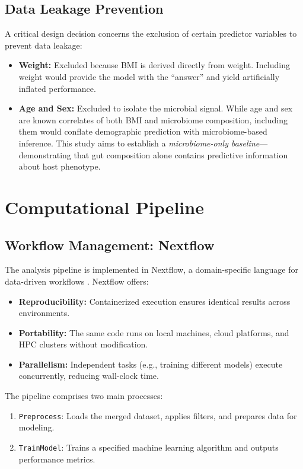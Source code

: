 \subsection{Data Leakage Prevention}

A critical design decision concerns the exclusion of certain predictor variables to prevent data leakage:

\begin{itemize}
    \item \textbf{Weight:} Excluded because BMI is derived directly from weight. Including weight would provide the model with the ``answer'' and yield artificially inflated performance.
    \item \textbf{Age and Sex:} Excluded to isolate the microbial signal. While age and sex are known correlates of both BMI and microbiome composition, including them would conflate demographic prediction with microbiome-based inference. This study aims to establish a \emph{microbiome-only baseline}---demonstrating that gut composition alone contains predictive information about host phenotype.
\end{itemize}

\section{Computational Pipeline}

\subsection{Workflow Management: Nextflow}

The analysis pipeline is implemented in Nextflow, a domain-specific language for data-driven workflows \cite{ditommaso2017nextflow}. Nextflow offers:

\begin{itemize}
    \item \textbf{Reproducibility:} Containerized execution ensures identical results across environments.
    \item \textbf{Portability:} The same code runs on local machines, cloud platforms, and HPC clusters without modification.
    \item \textbf{Parallelism:} Independent tasks (e.g., training different models) execute concurrently, reducing wall-clock time.
\end{itemize}

The pipeline comprises two main processes:

\begin{enumerate}
    \item \texttt{Preprocess}: Loads the merged dataset, applies filters, and prepares data for modeling.
    \item \texttt{TrainModel}: Trains a specified machine learning algorithm and outputs performance metrics.
\end{enumerate}

